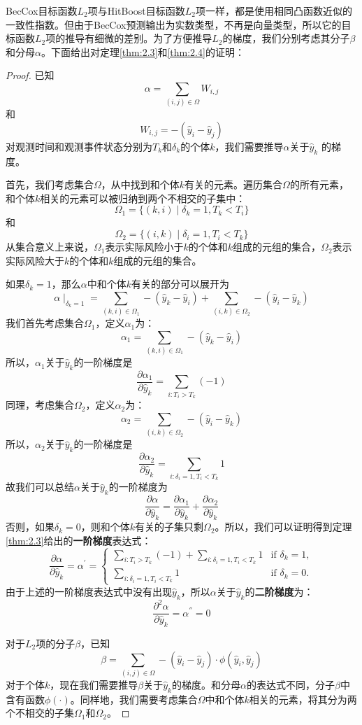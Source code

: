 BecCox目标函数$L_2$项与HitBoost目标函数$L_2$项一样，都是使用相同凸函数近似的一致性指数。但由于BecCox预测输出为实数类型，不再是向量类型，所以它的目标函数$L_2$项的推导有细微的差别。为了方便推导$L_2$的梯度，我们分别考虑其分子$\beta$和分母$\alpha$。下面给出对定理\ref{thm:2.3}和\ref{thm:2.4}的证明：
\begin{proof}
已知$$\alpha = \sum_{(i,j)\in \Omega} W_{i,j}$$ 和 $$W_{i,j}=-(\hat{y}_i-\hat{y}_j)$$对观测时间和观测事件状态分别为$T_k$和$\delta_k$的个体$k$，我们需要推导$\alpha$关于$\hat{y}_k$ 的梯度。

首先，我们考虑集合$\Omega$，从中找到和个体$k$有关的元素。遍历集合$\Omega$的所有元素，和个体$k$相关的元素可以被归纳到两个不相交的子集中：$$\Omega_1=\{(k,i) \mid \delta_k=1,T_k < T_i\}$$ 和 $$\Omega_2=\{(i,k) \mid \delta_i=1,T_i < T_k\}$$ 从集合意义上来说，$\Omega_1$表示实际风险小于$k$的个体和$k$组成的元组的集合，$\Omega_2$表示实际风险大于$k$的个体和$k$组成的元组的集合。

如果$\delta_k = 1$，那么$\alpha$中和个体$k$有关的部分可以展开为$$\alpha \mid_{\delta_k=1}=\sum_{(k,i)\in \Omega_1} -(\hat{y}_k-\hat{y}_i) + \sum_{(i,k)\in \Omega_2} -(\hat{y}_i-\hat{y}_k) $$ 我们首先考虑集合$\Omega_1$，定义$\alpha_1$为：$$\alpha_1 = \sum_{(k,i)\in \Omega_1} -(\hat{y}_k-\hat{y}_i)$$ 所以，$\alpha_1$关于$\hat{y}_k$的一阶梯度是$$\frac{\partial \alpha_1}{\partial \hat{y}_k} = \sum\limits_{i: T_i>T_k}(-1)$$ 同理，考虑集合$\Omega_2$，定义$\alpha_2$为：$$\alpha_2 = \sum_{(i,k)\in \Omega_2} -(\hat{y}_i-\hat{y}_k)$$ 所以，$\alpha_2$关于$\hat{y}_k$的一阶梯度是$$\frac{\partial \alpha_2}{\partial \hat{y}_k} = \sum\limits_{i: \delta_i=1,T_i<T_k} 1$$ 故我们可以总结$\alpha$关于$\hat{y}_k$的一阶梯度为$$\frac{\partial \alpha}{\partial \hat{y}_k} = \frac{\partial \alpha_1}{\partial \hat{y}_k} + \frac{\partial \alpha_2}{\partial \hat{y}_k}$$ 否则，如果$\delta_k = 0$，则和个体$k$有关的子集只剩$\Omega_2$。所以，我们可以证明得到定理\ref{thm:2.3}给出的\textbf{一阶梯度}表达式：$$
\frac{\partial \alpha}{\partial \hat{y}_k}=\alpha^{'}=
\begin{cases}
\sum\limits_{i: T_i>T_k}(-1) + \sum\limits_{i: \delta_i=1,T_i<T_k} 1 & \text{if } \delta_k = 1,\\
\sum\limits_{i: \delta_i=1,T_i<T_k} 1 & \text{if } \delta_k = 0.
\end{cases}
$$ 由于上述的一阶梯度表达式中没有出现$\hat{y}_k$，所以$\alpha$关于$\hat{y}_k$的\textbf{二阶梯度}为：$$
\frac{\partial^2 \alpha}{\partial \hat{y}_k}=\alpha^{''}=0
$$

对于$L_2$项的分子$\beta$，已知$$\beta = \sum_{(i,j)\in \Omega} -(\hat{y}_i-\hat{y}_j) \cdot \phi(\hat{y}_i, \hat{y}_j)$$ 对于个体$k$，现在我们需要推导$\beta$关于$\hat{y}_k$的梯度。和分母$\alpha$的表达式不同，分子$\beta$中含有函数$\phi(\cdot)$。同样地，我们需要考虑集合$\Omega$中和个体$k$相关的元素，将其分为两个不相交的子集$\Omega_1$和$\Omega_2$。


\end{proof}
